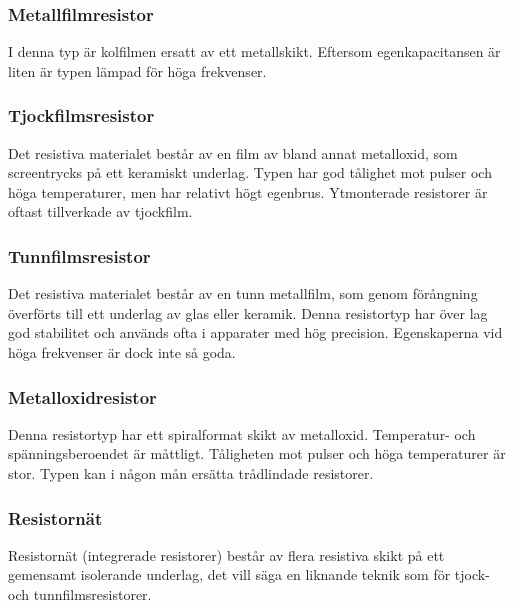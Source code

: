 \subsubsection{Metallfilmresistor}

I denna typ är kolfilmen ersatt av ett metallskikt.
Eftersom egenkapacitansen är liten är typen lämpad för höga frekvenser.

\subsubsection{Tjockfilmsresistor}

Det resistiva materialet består av en film av bland annat metalloxid, som
screentrycks på ett keramiskt underlag.
Typen har god tålighet mot pulser och höga temperaturer, men har relativt högt
egenbrus.
Ytmonterade resistorer är oftast tillverkade av tjockfilm.

\subsubsection{Tunnfilmsresistor}

Det resistiva materialet består av en tunn metallfilm, som genom förångning
överförts till ett underlag av glas eller keramik. Denna resistortyp har över
lag god stabilitet och används ofta i apparater med hög precision.
Egenskaperna vid höga frekvenser är dock inte så goda.

\subsubsection{Metalloxidresistor}

Denna resistortyp har ett spiralformat skikt av metalloxid.
Temperatur- och spänningsberoendet är måttligt.
Tåligheten mot pulser och höga temperaturer är stor.
Typen kan i någon mån ersätta trådlindade resistorer.

\subsubsection{Resistornät}

Resistornät (integrerade resistorer) består av flera resistiva skikt på ett
gemensamt isolerande underlag, det vill säga en liknande teknik som för tjock- 
och tunnfilmsresistorer.

